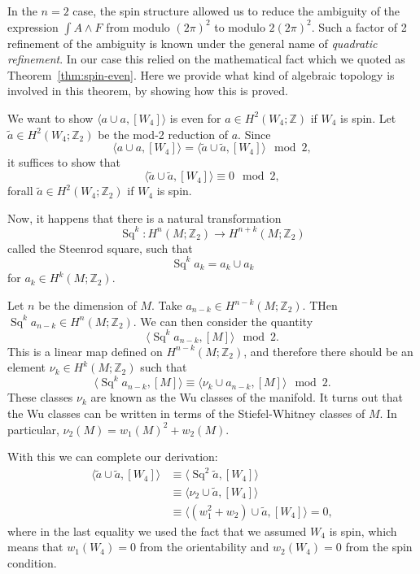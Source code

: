 \documentclass[12pt]{article}
\numberwithin{equation}{section}
\numberwithin{figure}{section}
\theoremstyle{remark}
\def\bZ{\mathbb{Z}}
\def\Sq{\mathop{\mathrm{Sq}}\nolimits}
\begin{document}
In the $n=2$ case, the spin structure allowed us to reduce
 the ambiguity of the expression $\int A\wedge F$ 
from modulo $(2\pi)^2$ to modulo $2(2\pi)^2$.
Such a factor of 2 refinement of the ambiguity is known under the general name of \emph{quadratic refinement}.
In our case this relied on the mathematical fact which we quoted as Theorem~\ref{thm:spin-even}.
Here we provide what kind of algebraic topology is involved in this theorem,
by showing how this is proved. 

We want to show $\langle a\cup a, [W_4]\rangle$ is even for $a\in H^2(W_4;\bZ)$
if $W_4$ is spin.
Let $\tilde a\in H^2(W_4;\bZ_2)$ be the mod-2 reduction of $a$.
Since \begin{equation}
\langle a\cup a, [W_4]\rangle = \langle \tilde a\cup \tilde a, [W_4]\rangle \mod 2,
\end{equation}
it suffices to show that \begin{equation}
\langle \tilde a\cup \tilde a, [W_4]\rangle \equiv 0 \mod 2, 
\end{equation} 
forall $\tilde a\in H^2(W_4;\bZ_2)$
if $W_4$ is spin.

Now, it happens that there is a natural transformation \begin{equation}
\Sq^k: H^n(M;\bZ_2)\to H^{n+k}(M;\bZ_2)
\end{equation} called the Steenrod square, such that \begin{equation}
\Sq^k a_k = a_k \cup a_k
\end{equation} for $a_k\in H^k(M;\bZ_2)$.

Let $n$ be the dimension of $M$. Take  $a_{n-k}\in H^{n-k}(M;\bZ_2)$.
THen $\Sq^k a_{n-k}\in H^n(M;\bZ_2)$.
We can then consider the quantity \begin{equation}
  \langle \Sq^k a_{n-k}, [M]\rangle \mod 2.
\end{equation}
This is a linear map defined on $H^{n-k}(M;\bZ_2)$,
and therefore there should be an element $\nu_k\in H^k(M;\bZ_2)$
such that \begin{equation}
  \langle \Sq^k a_{n-k}, [M]\rangle \equiv \langle \nu_k \cup a_{n-k}, [M]\rangle \mod 2.
\end{equation}
These classes $\nu_k$ are known as the Wu classes of the manifold.
It turns out that the Wu classes can be written in terms of the Stiefel-Whitney classes of $M$.
In particular, $\nu_2(M)=w_1(M)^2 + w_2(M)$.

With this we can complete our derivation:\begin{align}
\langle \tilde a\cup \tilde a, [W_4]\rangle 
&\equiv \langle \Sq^2 \tilde a, [W_4]\rangle \\
&\equiv \langle \nu_2 \cup \tilde a, [W_4]\rangle\\
&\equiv \langle (w_1^2 + w_2) \cup \tilde a, [W_4]\rangle =0,
\end{align}
where in the last equality we used the fact that we assumed $W_4$ is spin,
which means that $w_1(W_4)=0$ from the orientability
and $w_2(W_4)=0$ from the spin condition.
\end{document}
